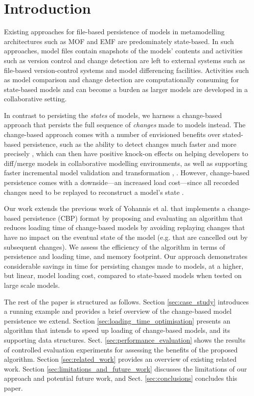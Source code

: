 \documentclass{llncs}
\begin{document}
\section{Introduction}
\label{sec:introduction}
Existing approaches for file-based persistence of models in metamodelling architectures such as MOF and EMF are predominately state-based. In such approaches, model files contain snapshots of the models' contents and activities such as version control and change detection are left to external systems such as file-based version-control systems and model differencing facilities. Activities such as model comparison and change detection are computationally consuming for state-based models and can become a burden as larger models are developed in a collaborative setting. 

In contrast to persisting the \emph{states} of models, we harness a change-based approach that persists the full sequence of \emph{changes} made to models instead. The change-based approach comes with a number of envisioned benefits over stated-based persistence, such as the ability to detect changes much faster and more precisely \cite{yohannis2017turning}, which can then have positive knock-on effects on helping developers to diff/merge models in collaborative modelling environments, as well as supporting faster incremental model validation and transformation \cite{rath2012derived}, \cite{ogunyomi2015property}. However, change-based persistence comes with a downside---an increased load cost---since all recorded changes need to be replayed to reconstruct a model's state \cite{yohannis2017turning}.   

Our work extends the previous work of Yohannis et al. \cite{yohannis2017turning} that implements a change-based persistence (CBP) format by proposing and evaluating an algorithm that reduces loading time of change-based models by avoiding replaying changes that have no impact on the eventual state of the model (e.g. that are cancelled out by subsequent changes). We assess the efficiency of the algorithm in terms of persistence and loading time, and memory footprint. Our approach demonstrates considerable savings in time for persisting changes made to models, at a higher, but linear, model loading cost, compared to state-based models when tested on large scale models. %

The rest of the paper is structured as follows. Section \ref{sec:case_study} introduces a running example and provides a brief overview of the change-based model persistence we extend. Section \ref{sec:loading_time_optimisation} presents an algorithm that intends to speed up loading of change-based models, and its supporting data structures. %
Sect. \ref{sec:performance_evaluation} shows the results of controlled evaluation experiments for assessing the benefits of the proposed algorithm. Section \ref{sec:related_work} provides an overview of existing related work. Section \ref{sec:limitations_and_future_work} discusses the limitations of our approach and potential future work, and Sect. \ref{sec:conclusions} concludes this paper.
\end{document}
